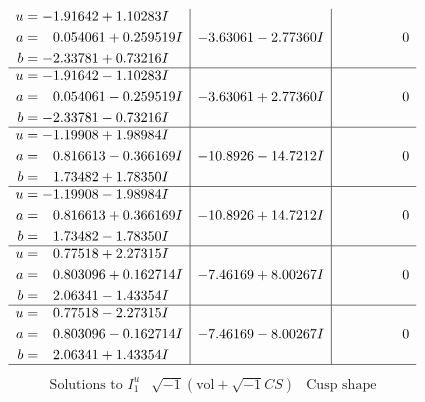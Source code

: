 \documentclass[1p]{elsarticle_modified}
\theoremstyle{definition}
\newcommand{\I}{\sqrt{-1}}
\begin{document}
$$\begin{array}{c|c|c}
\begin{aligned}
u &= -1.91642 + 1.10283 I \\
a &= \phantom{-}0.054061 + 0.259519 I \\
b &= -2.33781 + 0.73216 I\end{aligned}
 & -3.63061 - 2.77360 I & \phantom{-0.000000 } 0 \\ \hline\begin{aligned}
u &= -1.91642 - 1.10283 I \\
a &= \phantom{-}0.054061 - 0.259519 I \\
b &= -2.33781 - 0.73216 I\end{aligned}
 & -3.63061 + 2.77360 I & \phantom{-0.000000 } 0 \\ \hline\begin{aligned}
u &= -1.19908 + 1.98984 I \\
a &= \phantom{-}0.816613 - 0.366169 I \\
b &= \phantom{-}1.73482 + 1.78350 I\end{aligned}
 & -10.8926 - 14.7212 I & \phantom{-0.000000 } 0 \\ \hline\begin{aligned}
u &= -1.19908 - 1.98984 I \\
a &= \phantom{-}0.816613 + 0.366169 I \\
b &= \phantom{-}1.73482 - 1.78350 I\end{aligned}
 & -10.8926 + 14.7212 I & \phantom{-0.000000 } 0 \\ \hline\begin{aligned}
u &= \phantom{-}0.77518 + 2.27315 I \\
a &= \phantom{-}0.803096 + 0.162714 I \\
b &= \phantom{-}2.06341 - 1.43354 I\end{aligned}
 & -7.46169 + 8.00267 I & \phantom{-0.000000 } 0 \\ \hline\begin{aligned}
u &= \phantom{-}0.77518 - 2.27315 I \\
a &= \phantom{-}0.803096 - 0.162714 I \\
b &= \phantom{-}2.06341 + 1.43354 I\end{aligned}
 & -7.46169 - 8.00267 I & \phantom{-0.000000 } 0\\
 \hline 
 \end{array}$$\newpage$$\begin{array}{c|c|c}  
\text{Solutions to }I^u_{1}& \I (\text{vol} + \sqrt{-1}CS) & \text{Cusp shape}\\
 \hline 
\begin{aligned}

\end{aligned}
\end{array}$$
\end{document}
